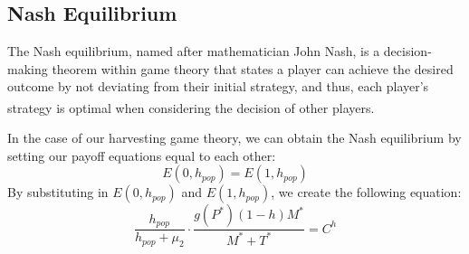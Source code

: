 \documentclass[12pt]{article}
\begin{document}
\subsection{Nash Equilibrium}
The Nash equilibrium, named after mathematician John Nash, is a decision-making theorem within game theory that states a player can achieve the desired outcome by not deviating from their initial strategy, and thus, each player's strategy is optimal when considering the decision of other players\textsuperscript{\cite{nash_definition}}. \par
In the case of our harvesting game theory, we can obtain the Nash equilibrium by setting our payoff equations equal to each other:
\begin{equation*}
    E(0, h_{pop}) = E(1, h_{pop})
\end{equation*}
By substituting in $E(0, h_{pop})$ and $E(1, h_{pop})$, we create the following equation:
\begin{equation}\label{eq:unsimplified_nash}
    \frac{h_{pop}}{h_{pop} + \mu_{2}} \cdot \frac{g(P^{*})(1-h)M^{*}}{M^{*} + T^{*}} = C^{h}
\end{equation}
\end{document}

